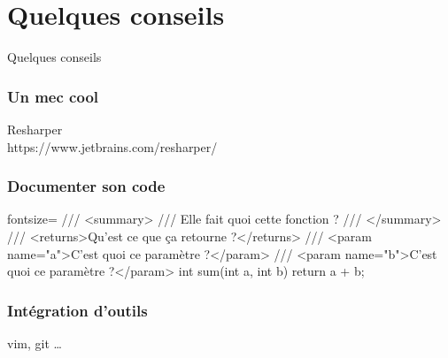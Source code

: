 \section{Quelques conseils}

\begingroup
\begin{frame}
    \begin{center}
        \vspace{1cm}
        {\Large\color{foreground}
            Quelques conseils
        }
    \end{center}
\end{frame}
\endgroup

\begin{frame}[fragile]
  \frametitle{Un mec cool}

  \begin{center}{\large Resharper\\https://www.jetbrains.com/resharper/}\end{center}
\end{frame}

\begin{frame}[fragile]
  \frametitle{Documenter son code}

  \begin{csharpcode*}{fontsize=\scriptsize}
    /// <summary>
    /// Elle fait quoi cette fonction ?
    /// </summary>
    /// <returns>Qu'est ce que ça retourne ?</returns>
    /// <param name="a">C'est quoi ce paramètre ?</param>
    /// <param name="b">C'est quoi ce paramètre ?</param>
    int sum(int a, int b)
    {
      return a + b;
    }
  \end{csharpcode*}
\end{frame}

\begin{frame}[fragile]
  \frametitle{Intégration d'outils}

  \begin{center}{\large vim, git \dots}\end{center}
\end{frame}

